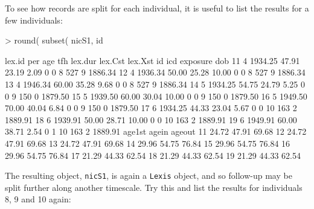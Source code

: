 \documentclass[a4paper,twoside,12pt]{article}
\begin{document}
To see how records are split for each individual, it is useful to list
the results for a few individuals:
\begin{Schunk}
\begin{Sinput}
> round( subset( nicS1, id %in% 8:10 ), 2 )
\end{Sinput}
\begin{Soutput}
   lex.id     per   age   tfh lex.dur lex.Cst lex.Xst id icd exposure     dob
11      4 1934.25 47.91 23.19    2.09       0       0  8 527        9 1886.34
12      4 1936.34 50.00 25.28   10.00       0       0  8 527        9 1886.34
13      4 1946.34 60.00 35.28    9.68       0       0  8 527        9 1886.34
14      5 1934.25 54.75 24.79    5.25       0       0  9 150        0 1879.50
15      5 1939.50 60.00 30.04   10.00       0       0  9 150        0 1879.50
16      5 1949.50 70.00 40.04    6.84       0       0  9 150        0 1879.50
17      6 1934.25 44.33 23.04    5.67       0       0 10 163        2 1889.91
18      6 1939.91 50.00 28.71   10.00       0       0 10 163        2 1889.91
19      6 1949.91 60.00 38.71    2.54       0       1 10 163        2 1889.91
   age1st agein ageout
11  24.72 47.91  69.68
12  24.72 47.91  69.68
13  24.72 47.91  69.68
14  29.96 54.75  76.84
15  29.96 54.75  76.84
16  29.96 54.75  76.84
17  21.29 44.33  62.54
18  21.29 44.33  62.54
19  21.29 44.33  62.54
\end{Soutput}
\end{Schunk}
The resulting object, \texttt{nicS1}, is again a \texttt{Lexis}
object, and so follow-up may be split further along another
timescale. Try this and list the results for individuals 8, 9 and 10 again:
\end{document}
